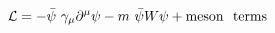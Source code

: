 \begin{equation}
{\cal{L}}= -\bar{\psi}~\gamma_\mu \partial^\mu \psi - m~\bar{\psi} W \psi +{\rm meson~~ terms}
\end{equation}

